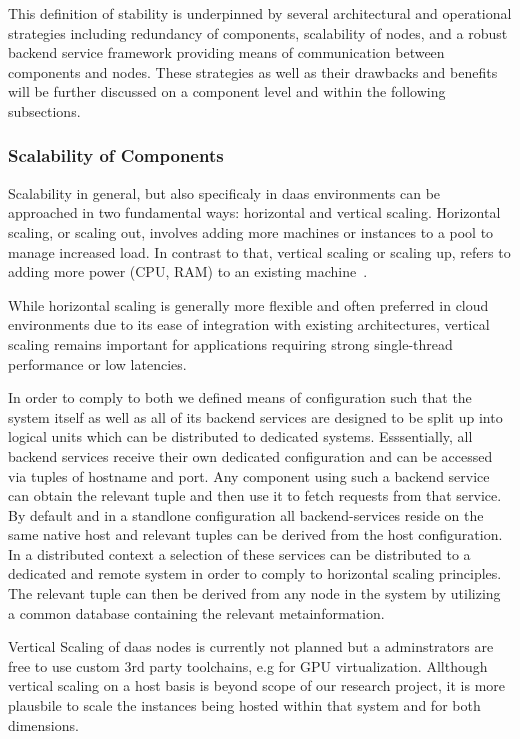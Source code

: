 \documentclass[runningheads]{llncs}
\begin{document}
This definition of stability is underpinned by several architectural
and operational strategies including redundancy of components, scalability of nodes,
and a robust backend service framework
providing means of communication between components and nodes.
These strategies as well as their drawbacks and benefits
will be further discussed on a component level
and within the following subsections.

\subsubsection{Scalability of Components}
Scalability in general, but also specificaly in daas environments
can be approached in two fundamental ways:
horizontal and vertical scaling.
Horizontal scaling, or scaling out, involves adding more machines or instances
to a pool to manage increased load.
In contrast to that, vertical scaling or scaling up,
refers to adding more power (CPU, RAM)
to an existing machine~\cite{vaquero2011dynamically}.

While horizontal scaling is generally more flexible
and often preferred in cloud environments
due to its ease of integration with existing architectures,
vertical scaling remains important for applications
requiring strong single-thread performance or low latencies.

In order to comply to both we defined means of configuration
such that the system itself as well as all of its backend services
are designed to be split up into logical units
which can be distributed to dedicated systems.
Esssentially, all backend services receive their own dedicated configuration
and can be accessed via tuples of hostname and port.
Any component using such a backend service can obtain the relevant tuple
and then use it to fetch requests from that service.
By default and in a standlone configuration
all backend-services reside on the same native host
and relevant tuples can be derived from the host configuration.
In a distributed context a selection of these services
can be distributed to a dedicated and remote system
in order to comply to horizontal scaling principles.
The relevant tuple can then be derived from any node in the system
by utilizing a common database containing the relevant metainformation.

Vertical Scaling of daas nodes is currently not planned
but a adminstrators are free to use custom 3rd party toolchains, e.g for GPU virtualization.
Allthough vertical scaling on a host basis
is beyond scope of our research project,
it is more plausbile to scale the instances
being hosted within that system and for both dimensions.
\end{document}
